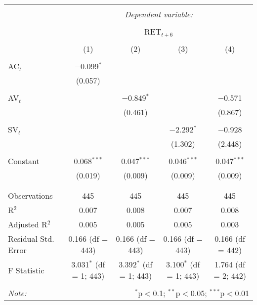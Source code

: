 
\begin{table}[!htbp] \centering 
  \caption{} 
  \label{} 
\begin{tabular}{@{\extracolsep{5pt}}lcccc} 
\\[-1.8ex]\hline 
\hline \\[-1.8ex] 
 & \multicolumn{4}{c}{\textit{Dependent variable:}} \\ 
\cline{2-5} 
\\[-1.8ex] & \multicolumn{4}{c}{RET$_{t+6}$} \\ 
\\[-1.8ex] & (1) & (2) & (3) & (4)\\ 
\hline \\[-1.8ex] 
 AC$_{t}$ & $-$0.099$^{*}$ &  &  &  \\ 
  & (0.057) &  &  &  \\ 
  & & & & \\ 
 AV$_{t}$ &  & $-$0.849$^{*}$ &  & $-$0.571 \\ 
  &  & (0.461) &  & (0.867) \\ 
  & & & & \\ 
 SV$_{t}$ &  &  & $-$2.292$^{*}$ & $-$0.928 \\ 
  &  &  & (1.302) & (2.448) \\ 
  & & & & \\ 
 Constant & 0.068$^{***}$ & 0.047$^{***}$ & 0.046$^{***}$ & 0.047$^{***}$ \\ 
  & (0.019) & (0.009) & (0.009) & (0.009) \\ 
  & & & & \\ 
\hline \\[-1.8ex] 
Observations & 445 & 445 & 445 & 445 \\ 
R$^{2}$ & 0.007 & 0.008 & 0.007 & 0.008 \\ 
Adjusted R$^{2}$ & 0.005 & 0.005 & 0.005 & 0.003 \\ 
Residual Std. Error & 0.166 (df = 443) & 0.166 (df = 443) & 0.166 (df = 443) & 0.166 (df = 442) \\ 
F Statistic & 3.031$^{*}$ (df = 1; 443) & 3.392$^{*}$ (df = 1; 443) & 3.100$^{*}$ (df = 1; 443) & 1.764 (df = 2; 442) \\ 
\hline 
\hline \\[-1.8ex] 
\textit{Note:}  & \multicolumn{4}{r}{$^{*}$p$<$0.1; $^{**}$p$<$0.05; $^{***}$p$<$0.01} \\ 
\end{tabular} 
\end{table} 
